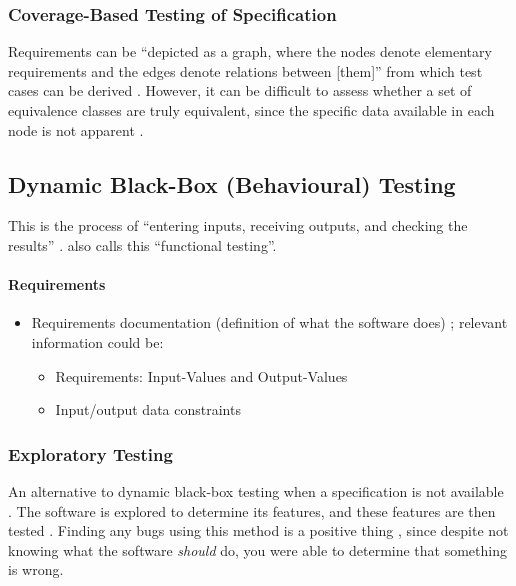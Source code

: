 \subsubsection{Coverage-Based Testing of Specification
      \citep[pp.~425-426]{vanVliet2000}}

Requirements can be ``depicted as a graph, where the nodes denote elementary
requirements and the edges denote relations between [them]'' from which test
cases can be derived \citep[p.~425]{vanVliet2000}. However, it can
be difficult to assess whether a set of equivalence classes are truly
equivalent, since the specific data available in each node is not apparent
\citep[p.~426]{vanVliet2000}.

\subsection{Dynamic Black-Box (Behavioural) Testing
      \citep[pp.~64-65]{Patton2006}}

This is the process of ``entering inputs, receiving outputs, and checking the
results'' \citep[p.~64]{Patton2006}. \citep[p.~399]{vanVliet2000}
also calls this ``functional testing''.

\paragraph{Requirements}
\begin{itemize}
      \item Requirements documentation (definition of what the software does)
            \citep[p.~64]{Patton2006}; relevant information could be:
            \begin{itemize}
                  \item Requirements: Input-Values and Output-Values
                  \item Input/output data constraints
            \end{itemize}
\end{itemize}

\subsubsection{Exploratory Testing \citep[p.~65]{Patton2006}}

An alternative to dynamic black-box testing when a specification is not
available \citep[p.~65]{Patton2006}. The software is explored to
determine its features, and these features are then tested
\citep[p.~65]{Patton2006}. Finding any bugs using this method is a
positive thing \citep[p.~65]{Patton2006}, since despite not knowing
what the software \emph{should} do, you were able to determine that something
is wrong.

